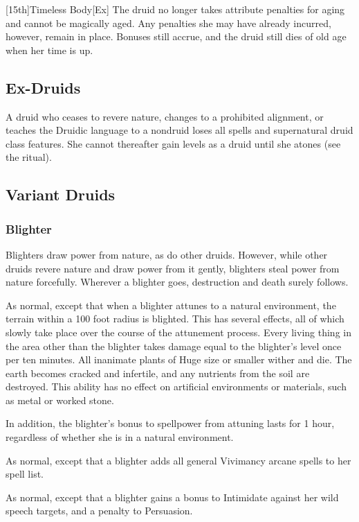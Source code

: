 [15th]{Timeless Body}[Ex]
The druid no longer takes attribute penalties for aging and cannot be magically aged.
Any penalties she may have already incurred, however, remain in place.
Bonuses still accrue, and the druid still dies of old age when her time is up.

\subsection{Ex-Druids}
A druid who ceases to revere nature, changes to a prohibited alignment, or teaches the Druidic language to a nondruid loses all spells and supernatural druid class features.
She cannot thereafter gain levels as a druid until she atones (see the  ritual).

\subsection{Variant Druids}

\subsubsection{Blighter}

Blighters draw power from nature, as do other druids. However, while other druids revere nature and draw power from it gently, blighters steal power from nature forcefully. Wherever a blighter goes, destruction and death surely follows.

 As normal, except that when a blighter attunes to a natural environment, the terrain within a 100 foot radius is blighted.
This has several effects, all of which slowly take place over the course of the attunement process.
Every living thing in the area other than the blighter takes damage equal to the blighter's level once per ten minutes.
All inanimate plants of Huge size or smaller wither and die.
The earth becomes cracked and infertile, and any nutrients from the soil are destroyed.
This ability has no effect on artificial environments or materials, such as metal or worked stone.

In addition, the blighter's bonus to spellpower from attuning lasts for 1 hour, regardless of whether she is in a natural environment.

 As normal, except that a blighter adds all general Vivimancy arcane spells to her spell list.

 As normal, except that a blighter gains a  bonus to Intimidate against her wild speech targets, and a  penalty to Persuasion.

